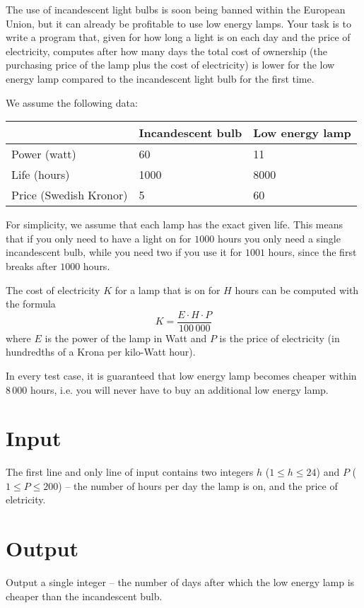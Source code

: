 The use of incandescent light bulbs is soon being banned within the European Union, but it can already be profitable to use low energy lamps.
Your task is to write a program that, given for how long a light is on each day and the price of electricity, computes after how many days the total cost of ownership (the purchasing price of the lamp plus the cost of electricity) is lower for the low energy lamp compared to the incandescent light bulb for the first time.

We assume the following data:

\noindent
\begin{tabular}{|l|l|l|}
\hline
& Incandescent bulb & Low energy lamp \\ \hline
Power (watt)           & 60                & 11             \\ \hline
Life (hours)           & 1000              & 8000           \\ \hline
Price (Swedish Kronor) & 5                 & 60             \\ \hline
\end{tabular}

For simplicity, we assume that each lamp has the exact given life.
This means that if you only need to have a light on for $1000$ hours you only need a single incandescent bulb, while you need two if you use it for $1001$ hours, since the first breaks after $1000$ hours.

The cost of electricity $K$ for a lamp that is on for $H$ hours can be computed with the formula
$$ K = \frac{E \cdot H \cdot P}{100\,000} $$
where $E$ is the power of the lamp in Watt and $P$ is the price of electricity (in hundredths of a Krona per kilo-Watt hour).

In every test case, it is guaranteed that low energy lamp becomes cheaper within $8\,000$ hours, i.e. you will never have to buy an additional low energy lamp.

\section*{Input}
The first line and only line of input contains two integers $h$ ($1 \le h \le 24$) and $P$ ($1 \le P \le 200$) -- the number of hours per day the lamp is on, and the price of eletricity.

\section*{Output}
Output a single integer -- the number of days after which the low energy lamp is cheaper than the incandescent bulb.

